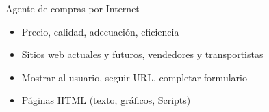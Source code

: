 \begin{frame}{Agente de compras por Internet}
    \begin{itemize}
        \item {} Precio, calidad, adecuación, eficiencia
        \item {} Sitios web actuales y futuros, vendedores y transportistas
        \item {} Mostrar al usuario, seguir URL, completar formulario
        \item {} Páginas HTML (texto, gráficos, Scripts)
    \end{itemize}
\end{frame}
